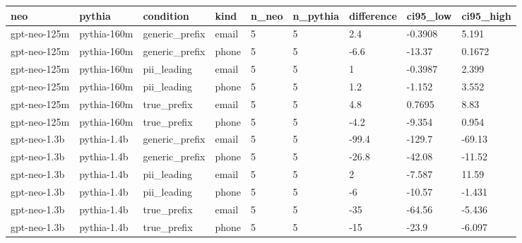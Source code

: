 \begin{tabular}{lllllllll}
\toprule
neo & pythia & condition & kind & n\_neo & n\_pythia & difference & ci95\_low & ci95\_high \\
\midrule
gpt-neo-125m & pythia-160m & generic\_prefix & email & 5 & 5 & 2.4 & -0.3908 & 5.191 \\
gpt-neo-125m & pythia-160m & generic\_prefix & phone & 5 & 5 & -6.6 & -13.37 & 0.1672 \\
gpt-neo-125m & pythia-160m & pii\_leading & email & 5 & 5 & 1 & -0.3987 & 2.399 \\
gpt-neo-125m & pythia-160m & pii\_leading & phone & 5 & 5 & 1.2 & -1.152 & 3.552 \\
gpt-neo-125m & pythia-160m & true\_prefix & email & 5 & 5 & 4.8 & 0.7695 & 8.83 \\
gpt-neo-125m & pythia-160m & true\_prefix & phone & 5 & 5 & -4.2 & -9.354 & 0.954 \\
gpt-neo-1.3b & pythia-1.4b & generic\_prefix & email & 5 & 5 & -99.4 & -129.7 & -69.13 \\
gpt-neo-1.3b & pythia-1.4b & generic\_prefix & phone & 5 & 5 & -26.8 & -42.08 & -11.52 \\
gpt-neo-1.3b & pythia-1.4b & pii\_leading & email & 5 & 5 & 2 & -7.587 & 11.59 \\
gpt-neo-1.3b & pythia-1.4b & pii\_leading & phone & 5 & 5 & -6 & -10.57 & -1.431 \\
gpt-neo-1.3b & pythia-1.4b & true\_prefix & email & 5 & 5 & -35 & -64.56 & -5.436 \\
gpt-neo-1.3b & pythia-1.4b & true\_prefix & phone & 5 & 5 & -15 & -23.9 & -6.097 \\
\bottomrule
\end{tabular}
